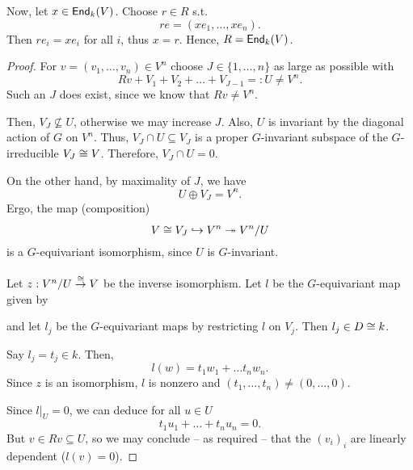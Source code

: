 Now, let $x \in \textsf{End}_k(V)$. Choose $r \in R$ s.t.
\[re = (xe_1, \ldots, xe_n). \]
Then $re_i = xe_i$ for all $i$, thus $x = r$. Hence, $R = \textsf{End}_k(V)$.
\begin{proof}
	For $v = (v_1,\ldots, v_n) \in V^n$
choose $J \in \{1, \ldots, n\}$ as large as possible with
\[ Rv + V_1 + V_2 + \ldots + V_{J-1} =: U \neq V^n. \]
Such an $J$ does exist, since we know that $Rv \neq V^n$.

Then, $V_J \not\subseteq U$, otherwise we may increase $J$. Also, $U$ is invariant by the diagonal action of $G$ on $V^n$.
Thus, $V_J \cap U \subseteq V_J$ is a proper $G$-invariant subspace of the $G$-irreducible $V_J \overset{}{\cong} V$. Therefore, $V_J \cap U = 0$.

On the other hand, by maximality of $J$, we have
\[ U \oplus V_J = V^n. \]
Ergo, the map (composition)
\[ V\overset{}{\cong} V_J \overset{}{\hookrightarrow} V^n \overset{}{\twoheadrightarrow} V^n/ U  \]
is a $G$-equivariant isomorphism, since $U$ is $G$-invariant.

Let $z : V^n / U \overset{\overset{}{\cong}}{\rightarrow} V$ be the inverse isomorphism. Let $l$ be the $G$-equivariant map given by
\begin{center}
\end{center}
and let $l_j$ be the $G$-equivariant maps by restricting $l$ on $V_j$. Then $l_j \in D \overset{}{\cong} k$.

Say $l_j = t_j \in k$. Then, 
\[ l(w) = t_1 w_1 + \ldots t_nw_n. \]
Since $z$ is an isomorphism, $l$ is nonzero and $(t_1, \ldots, t_n) \neq (0,\ldots, 0)$.

Since $l|_U = 0$, we can deduce for all $u \in U$
\[ t_1u_1+ \ldots + t_nu_n = 0. \]
But $v \in Rv \subseteq U$, so we may conclude -- as required -- that the $(v_i)_i$ are linearly dependent ($l(v) = 0$).
\end{proof}

\newpage
